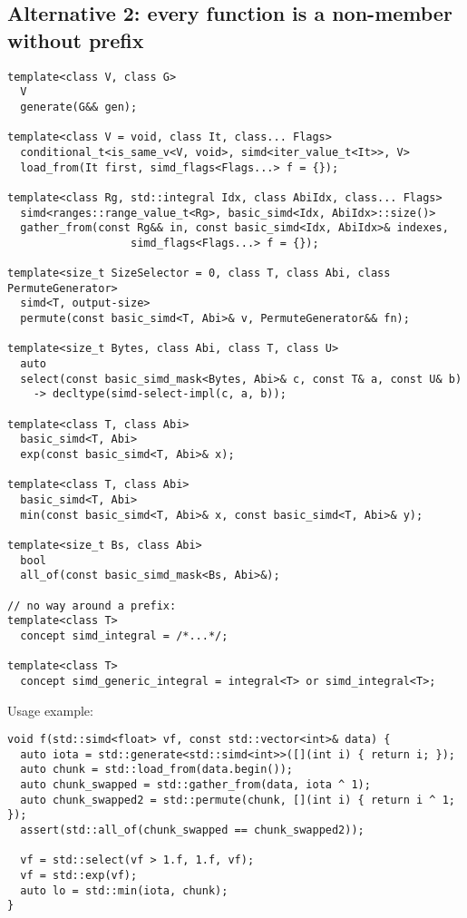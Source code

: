 \subsection{Alternative 2: every function is a non-member without  prefix}

\medskip\begin{lstlisting}[style=Vc]
template<class V, class G>
  V
  generate(G&& gen);

template<class V = void, class It, class... Flags>
  conditional_t<is_same_v<V, void>, simd<iter_value_t<It>>, V>
  load_from(It first, simd_flags<Flags...> f = {});

template<class Rg, std::integral Idx, class AbiIdx, class... Flags>
  simd<ranges::range_value_t<Rg>, basic_simd<Idx, AbiIdx>::size()>
  gather_from(const Rg&& in, const basic_simd<Idx, AbiIdx>& indexes,
                   simd_flags<Flags...> f = {});

template<size_t SizeSelector = 0, class T, class Abi, class PermuteGenerator>
  simd<T, output-size>
  permute(const basic_simd<T, Abi>& v, PermuteGenerator&& fn);

template<size_t Bytes, class Abi, class T, class U>
  auto
  select(const basic_simd_mask<Bytes, Abi>& c, const T& a, const U& b)
    -> decltype(simd-select-impl(c, a, b));

template<class T, class Abi>
  basic_simd<T, Abi>
  exp(const basic_simd<T, Abi>& x);

template<class T, class Abi>
  basic_simd<T, Abi>
  min(const basic_simd<T, Abi>& x, const basic_simd<T, Abi>& y);

template<size_t Bs, class Abi>
  bool
  all_of(const basic_simd_mask<Bs, Abi>&);

// no way around a prefix:
template<class T>
  concept simd_integral = /*...*/;

template<class T>
  concept simd_generic_integral = integral<T> or simd_integral<T>;
\end{lstlisting}

Usage example:
\medskip\begin{lstlisting}[style=Vc]
void f(std::simd<float> vf, const std::vector<int>& data) {
  auto iota = std::generate<std::simd<int>>([](int i) { return i; });
  auto chunk = std::load_from(data.begin());
  auto chunk_swapped = std::gather_from(data, iota ^ 1);
  auto chunk_swapped2 = std::permute(chunk, [](int i) { return i ^ 1; });
  assert(std::all_of(chunk_swapped == chunk_swapped2));

  vf = std::select(vf > 1.f, 1.f, vf);
  vf = std::exp(vf);
  auto lo = std::min(iota, chunk);
}
\end{lstlisting}

